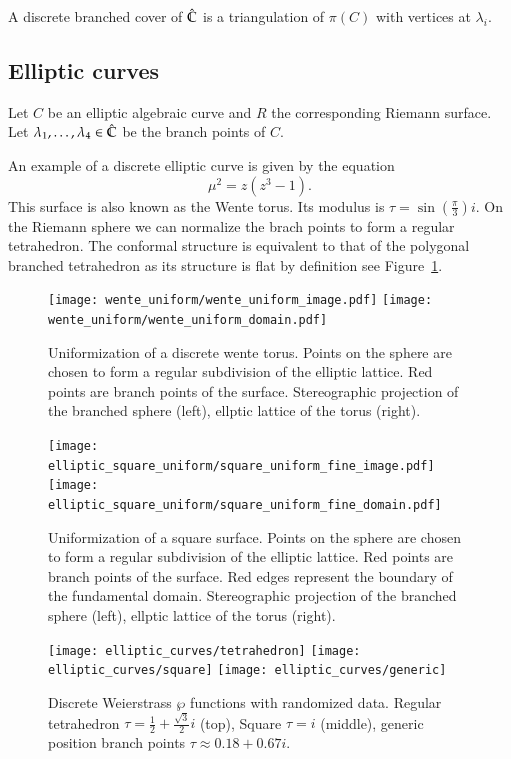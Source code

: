 \documentclass[Thesis.tex]{subfiles}
\begin{document}
A discrete branched cover of $\hat{\mathbb C}$ is a triangulation of $\pi(C)$ with vertices at $\lambda_i$.


\subsection{Elliptic curves}

Let $C$ be an elliptic algebraic curve and $R$ the corresponding Riemann surface. Let $\lambda_1, \ldots, \lambda_4 \in \hat{\mathbb C}$ be the branch points of $C$. 

\begin{example}
\label{ex:wente_elliptic}
An example of a discrete elliptic curve is given by the equation
\begin{equation}
	\mu^2=z(z^3-1).
\end{equation}
This surface is also known as the Wente torus. Its modulus is $\tau=\sin(\frac{\pi}{3})i$. On the Riemann sphere
we can normalize the brach points to form a regular tetrahedron. The conformal structure is equivalent to that of 
the polygonal branched tetrahedron as its structure is flat by definition see Figure~\ref{fig:wente_elliptic}.
\end{example}

\begin{figure}
	\centering
	\texttt{[image: wente\_uniform/wente\_uniform\_image.pdf]}
	\texttt{[image: wente\_uniform/wente\_uniform\_domain.pdf]}
	\caption{Uniformization of a discrete wente torus. Points on the sphere are chosen to 
form a regular subdivision of the elliptic lattice. Red points are branch points of the surface.
Stereographic projection of the branched sphere (left), ellptic lattice of the torus (right).}
	\label{fig:wente_elliptic}
\end{figure}

\begin{figure}
	\centering
	\texttt{[image: elliptic\_square\_uniform/square\_uniform\_fine\_image.pdf]}
	\texttt{[image: elliptic\_square\_uniform/square\_uniform\_fine\_domain.pdf]}
	\caption{Uniformization of a square surface. Points on the sphere are chosen to form a 
regular subdivision of the elliptic lattice. Red points are branch points of the surface. Red 
edges represent the boundary of the fundamental domain. Stereographic projection of the 
branched sphere (left), ellptic lattice of the torus (right).}
	\label{fig:square_elliptic}
\end{figure}	


\begin{figure}[p]
	\texttt{[image: elliptic\_curves/tetrahedron]}
	\texttt{[image: elliptic\_curves/square]}
	\texttt{[image: elliptic\_curves/generic]}
	\caption{Discrete Weierstrass $\wp$ functions with randomized data. Regular tetrahedron $\tau=\frac{1}{2}+\frac{\sqrt 3}{2}i$ (top), Square $\tau=i$ (middle), generic position branch points $\tau \approx 0.18+0.67i$.}
\end{figure}
\end{document}
